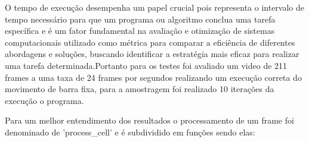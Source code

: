 O tempo de execução desempenha um papel crucial pois representa o intervalo de tempo necessário para que um programa ou algoritmo conclua uma tarefa específica e é um fator fundamental na avaliação e otimização de sistemas computacionais utilizado como métrica para comparar a eficiência de diferentes abordagens e soluções, buscando identificar a estratégia mais eficaz para realizar uma tarefa determinada.Portanto para os testes foi avaliado um video de 211 frames a uma taxa de 24 frames por segundos realizando um execução correta do movimento de barra fixa, para a amostragem foi realizado 10 iterações da execução o programa.


\newpage
Para um melhor entendimento dos resultados o processamento de um frame foi denominado de 'process\_cell' e é subdividido em funções sendo elas:


